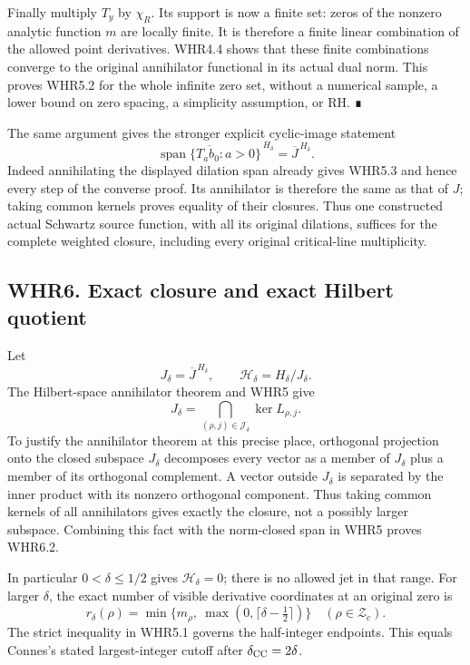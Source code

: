 Finally multiply \(T_y\) by \(\chi_R\). Its support is now a finite set:
zeros of the nonzero analytic function \(m\) are locally finite. It is
therefore a finite linear combination of the allowed point derivatives.
WHR4.4 shows that these finite combinations converge to the original
annihilator functional in its actual dual norm. This proves WHR5.2 for
the whole infinite zero set, without a numerical sample, a lower bound
on zero spacing, a simplicity assumption, or RH. ∎

The same argument gives the stronger explicit cyclic-image statement \[
 \boxed{\overline{\operatorname{span}\{T_ab_0:a>0\}}^{\,H_\delta}
            =\overline J^{\,H_\delta}.}
 \tag{WHR5.5}
\] Indeed annihilating the displayed dilation span already gives WHR5.3
and hence every step of the converse proof. Its annihilator is therefore
the same as that of \(J\); taking common kernels proves equality of
their closures. Thus one constructed actual Schwartz source function,
with all its original dilations, suffices for the complete weighted
closure, including every original critical-line multiplicity.

\subsection{WHR6. Exact closure and exact Hilbert
quotient}\label{whr6.-exact-closure-and-exact-hilbert-quotient}

Let \[
 J_\delta=\overline J^{\,H_\delta},\qquad
 \mathcal H_\delta=H_\delta/J_\delta.
 \tag{WHR6.1}
\] The Hilbert-space annihilator theorem and WHR5 give \[
 \boxed{J_\delta=
 \bigcap_{(\rho,j)\in\mathscr J_\delta}\ker L_{\rho,j}.}
 \tag{WHR6.2}
\] To justify the annihilator theorem at this precise place, orthogonal
projection onto the closed subspace \(J_\delta\) decomposes every vector
as a member of \(J_\delta\) plus a member of its orthogonal complement.
A vector outside \(J_\delta\) is separated by the inner product with its
nonzero orthogonal component. Thus taking common kernels of all
annihilators gives exactly the closure, not a possibly larger subspace.
Combining this fact with the norm-closed span in WHR5 proves WHR6.2.

In particular \(0<\delta\leq1/2\) gives \(\mathcal H_\delta=0\); there
is no allowed jet in that range. For larger \(\delta\), the exact number
of visible derivative coordinates at an original zero is \[
 r_\delta(\rho)=\min\{m_\rho,\ \max(0,\lceil\delta-\tfrac12\rceil)\}
 \quad(\rho\in\mathscr Z_c).
 \tag{WHR6.3}
\] The strict inequality in WHR5.1 governs the half-integer endpoints.
This equals Connes's stated largest-integer cutoff after
\(\delta_{\rm CC}=2\delta\).

